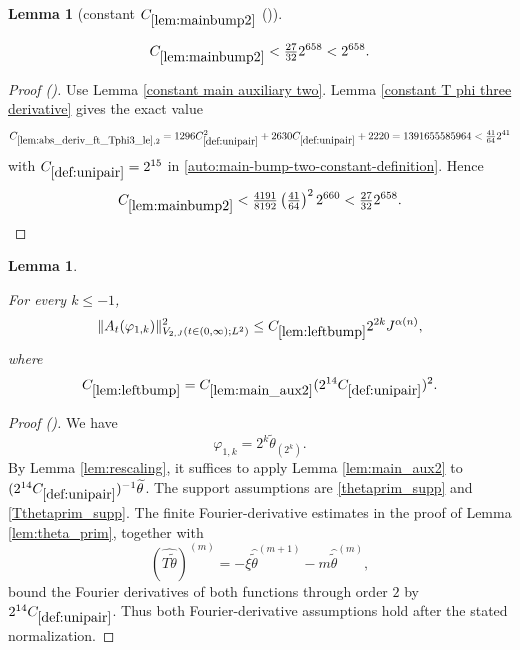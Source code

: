 \documentclass[12pt,reqno]{amsart}
\newcommand{\auto}{{({\tiny\faCar})}}
\theoremstyle{plain}
\newtheorem{lemma}[theorem]{Lemma}
\numberwithin{equation}{section}
\theoremstyle{remark}
\newcommand{\uses}[1]{}
\newcommand{\usesdefs}[1]{}
\newcommand{\leanok}{}
\newcommand{\lean}[1]{}
\begin{document}
\begin{lemma}[constant $C_{\ref{lem:mainbump2}}$ \auto]\label{constant main bump two}\uses{constant main auxiliary two,lem:abs_deriv_ft_Tphi3_le,constant T phi three derivative,lem:mainbump2}\usesdefs{def:unipair}
\lean{Auto.constantMainBumpTwo}
\leanok
\begin{equation}\label{constant main bump two bound}
C_{\ref{lem:mainbump2}}<\tfrac{27}{32}2^{658}<2^{658}.
\end{equation}
\end{lemma}
\begin{proof}[Proof \auto]
Use Lemma \ref{constant main auxiliary two}. Lemma \ref{constant T phi three derivative} gives the exact value
\[
C_{\ref{lem:abs_deriv_ft_Tphi3_le},2}
=1296C_{\ref{def:unipair}}^2+2630C_{\ref{def:unipair}}+2220
=1391655585964
<\tfrac{41}{64}2^{41}
\]
with $C_{\ref{def:unipair}}=2^{15}$ in \eqref{auto:main-bump-two-constant-definition}. Hence
\[
C_{\ref{lem:mainbump2}}
<\tfrac{4191}{8192}\left(\tfrac{41}{64}\right)^2 2^{660}
<\tfrac{27}{32}2^{658}.
\]
\end{proof}

\begin{lemma}\label{lem:leftbump}\uses{lem:rescaling,lem:main_aux2,lem:theta_prim}\usesdefs{A_def,def:unipair,defn:window based bump functions}
\lean{Auto.leftBump}
\leanok
For every $k\le-1$,
\begin{equation}\label{leftbump}
\|A_t(\varphi_{1,k})\|_{V_{2,J}(t\in(0,\infty);L^2)}^2
\le C_{\ref{lem:leftbump}}2^{2k}J^{\alpha(n)},
\end{equation}
where
\begin{equation}\label{auto:left-bump-constant-definition}
C_{\ref{lem:leftbump}}
=C_{\ref{lem:main_aux2}}(2^{14}C_{\ref{def:unipair}})^2.
\end{equation}
\end{lemma}

\begin{proof}[Proof \auto]
We have
\[
\varphi_{1,k}=2^k\widetilde\theta_{(2^k)}.
\]
By Lemma \ref{lem:rescaling}, it suffices to apply Lemma \ref{lem:main_aux2} to $(2^{14}C_{\ref{def:unipair}})^{-1}\widetilde\theta$. The support assumptions are \eqref{thetaprim_supp} and \eqref{Tthetaprim_supp}. The finite Fourier-derivative estimates in the proof of Lemma \ref{lem:theta_prim}, together with
\[
(\widehat{T\widetilde\theta})^{(m)}
=-\xi\widehat{\widetilde\theta}^{(m+1)}
-m\widehat{\widetilde\theta}^{(m)},
\]
bound the Fourier derivatives of both functions through order $2$ by $2^{14}C_{\ref{def:unipair}}$. Thus both Fourier-derivative assumptions hold after the stated normalization.
\end{proof}
\end{document}
